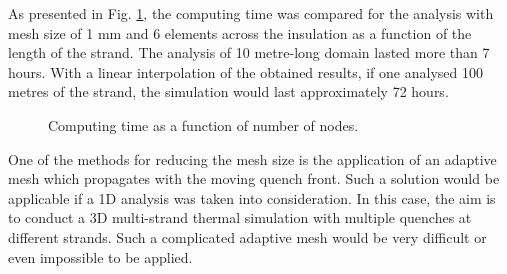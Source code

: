 As presented in Fig. \ref{fig: quench_propagation_conclusion_computing_time_estimation}, the computing time was compared for the analysis with mesh size of 1 mm and 6 elements across the insulation as a function of the length of the strand. The analysis of 10 metre-long domain lasted more than 7 hours. With a linear interpolation of the obtained results, if one analysed 100 metres of the strand, the simulation would last approximately 72 hours.

\begin{figure}[H]
\centering
    \caption{Computing time as a function of number of nodes.}
    \label{fig: quench_propagation_conclusion_computing_time_estimation}
\end{figure}

One of the methods for reducing the mesh size is the application of an adaptive mesh which propagates with the moving quench front. Such a solution would be applicable if a 1D analysis was taken into consideration. In this case, the aim is to conduct a 3D multi-strand thermal simulation with multiple quenches at different strands. Such a complicated adaptive mesh would be very difficult or even impossible to be applied.


